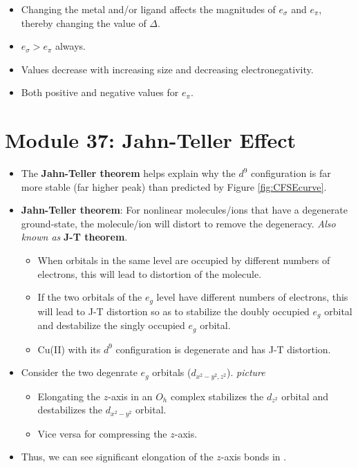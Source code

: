 \documentclass[../notes.tex]{subfiles}
\begin{document}
\begin{itemize}
    \item Changing the metal and/or ligand affects the magnitudes of $e_\sigma$ and $e_\pi$, thereby changing the value of $\Delta$.
    \item $e_\sigma>e_\pi$ always.
    \item Values decrease with increasing size and decreasing electronegativity.
    \item Both positive and negative values for $e_\pi$.
\end{itemize}



\section{Module 37: Jahn-Teller Effect}
\begin{itemize}
    \item The \textbf{Jahn-Teller theorem} helps explain why the $d^9$ configuration is far more stable (far higher peak) than predicted by Figure \ref{fig:CFSEcurve}.
    \item \textbf{Jahn-Teller theorem}: For nonlinear molecules/ions that have a degenerate ground-state, the molecule/ion will distort to remove the degeneracy. \emph{Also known as} \textbf{J-T theorem}.
    \begin{itemize}
        \item When orbitals in the same level are occupied by different numbers of electrons, this will lead to distortion of the molecule.
        \item If the two orbitals of the $e_g$ level have different numbers of electrons, this will lead to J-T distortion so as to stabilize the doubly occupied $e_g$ orbital and destabilize the singly occupied $e_g$ orbital.
        \item Cu(II) with its $d^9$ configuration is degenerate and has J-T distortion.
    \end{itemize}
    \item Consider the two degenrate $e_g$ orbitals ($d_{x^2-y^2,z^2}$).
    \emph{picture}
    \begin{itemize}
        \item Elongating the $z$-axis in an $O_h$ complex stabilizes the $d_{z^2}$ orbital and destabilizes the $d_{x^2-y^2}$ orbital.
        \item Vice versa for compressing the $z$-axis.
    \end{itemize}
    \item Thus, we can see significant elongation of the $z$-axis bonds in .

\end{itemize}
\end{document}
